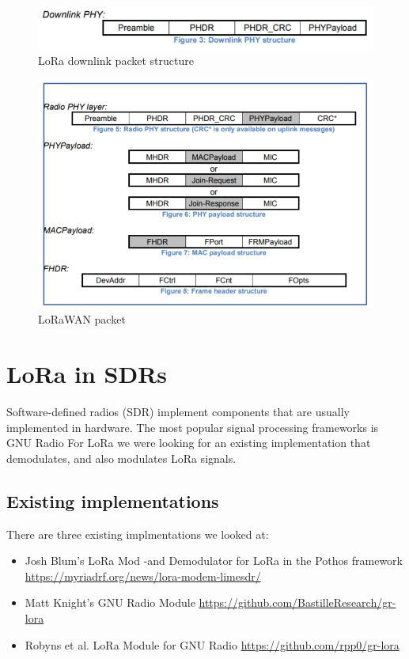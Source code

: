 \begin{figure}[h]
    \centering
    \includegraphics[width=1\textwidth]{figures/downlink_struct.png}
    \caption{LoRa downlink packet structure~\cite{lora_wan_spec}}
    \label{fig:downlink_struct}
\end{figure}

\begin{figure}[h]
    \centering
    \includegraphics[width=1\textwidth]{figures/lorawan_struct.png}
    \caption{LoRaWAN packet~\cite{lora_wan_spec}}
    \label{fig:lora_wan_struct}
\end{figure}

\chapter{LoRa in SDRs}
Software-defined radios (SDR) implement components that are usually implemented in hardware.
The most popular signal processing frameworks is GNU Radio
For LoRa we were looking for an existing implementation that demodulates, and also modulates LoRa signals.

\section{Existing implementations}
There are three existing implmentations we looked at:
\begin{itemize}
    \item Josh Blum's LoRa Mod -and Demodulator for LoRa in the Pothos framework \url{https://myriadrf.org/news/lora-modem-limesdr/}
    \item Matt Knight's GNU Radio Module \url{https://github.com/BastilleResearch/gr-lora}
    \item Robyns et al. LoRa Module for GNU Radio \url{https://github.com/rpp0/gr-lora}
\end{itemize}

